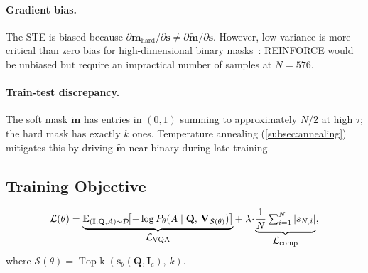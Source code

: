 \documentclass[11pt,a4paper]{article}
\DeclareMathOperator{\TopK}{Top\text{-}k}
\newcommand{\E}{\mathbb{E}}
\newcommand{\vm}{\mathbf{m}}        %
\newcommand{\vs}{\mathbf{s}}
\newcommand{\mI}{\mathbf{I}}
\newcommand{\mQ}{\mathbf{Q}}
\newcommand{\mV}{\mathbf{V}}
\begin{document}
\paragraph{Gradient bias.} The STE is biased because
$\partial\vm_{\mathrm{hard}}/\partial\vs \neq \partial\tilde{\vm}/\partial\vs$.
However, low variance is more critical than zero bias for high-dimensional binary
masks~\citep{bengio2013estimating}: REINFORCE would be unbiased but require an
impractical number of samples at $N{=}576$.

\paragraph{Train-test discrepancy.} The soft mask $\tilde{\vm}$ has entries in
$(0,1)$ summing to approximately $N/2$ at high $\tau$; the hard mask has exactly
$k$ ones. Temperature annealing (\cref{subsec:annealing}) mitigates this by
driving $\tilde{\vm}$ near-binary during late training.

\subsection{Training Objective}
\label{subsec:objective}

\begin{mathbox}[title={TC-ViTok Objective}]
\begin{equation}
  \mathcal{L}(\theta)
  = \underbrace{%
      \E_{(\mI,\mQ,A)\sim\mathcal{D}}\!\bigl[
        -\log P_\theta(A \mid \mQ,\,\mV_{\mathcal{S}(\theta)})
      \bigr]}_{\displaystyle\mathcal{L}_{\mathrm{VQA}}}
  + \;\lambda\!\cdot\!
    \underbrace{\frac{1}{N}\textstyle\sum_{i=1}^{N}|s_{N,i}|}_{%
      \displaystyle\mathcal{L}_{\mathrm{comp}}},
  \label{eq:objective}
\end{equation}
where $\mathcal{S}(\theta)=\TopK(\vs_\theta(\mQ,\mI_c),\,k)$.
\end{mathbox}
\end{document}
